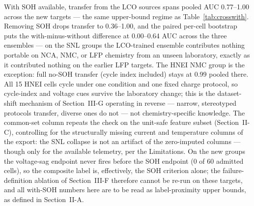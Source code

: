 \documentclass[preprint,12pt]{elsarticle}
\begin{document}
With SOH available, transfer from the LCO sources spans pooled AUC 0.77--1.00 across the new targets --- the same upper-bound regime as Table~\ref{tab:crosswith}. Removing SOH drops transfer to 0.36--1.00, and the paired per-cell bootstrap puts the with-minus-without difference at 0.00--0.64 AUC across the three ensembles --- on the SNL groups the LCO-trained ensemble contributes nothing portable on NCA, NMC, or LFP chemistry from an unseen laboratory, exactly as it contributed nothing on the earlier LFP targets. The HNEI NMC group is the exception: full no-SOH transfer (cycle index included) stays at 0.99 pooled there. All 15 HNEI cells cycle under one condition and one fixed charge protocol, so cycle-index and voltage cues survive the laboratory change; this is the dataset-shift mechanism of Section~III-G operating in reverse --- narrow, stereotyped protocols transfer, diverse ones do not --- not chemistry-specific knowledge. The common-set column repeats the check on the unit-safe feature subset (Section~II-C), controlling for the structurally missing current and temperature columns of the export: the SNL collapse is not an artifact of the zero-imputed columns --- though only for the available telemetry, per the Limitations. On the new groups the voltage-sag endpoint never fires before the SOH endpoint (0 of 60 admitted cells), so the composite label is, effectively, the SOH criterion alone; the failure-definition ablation of Section~III-F therefore cannot be re-run on these targets, and all with-SOH numbers here are to be read as label-proximity upper bounds, as defined in Section~II-A.
\end{document}
